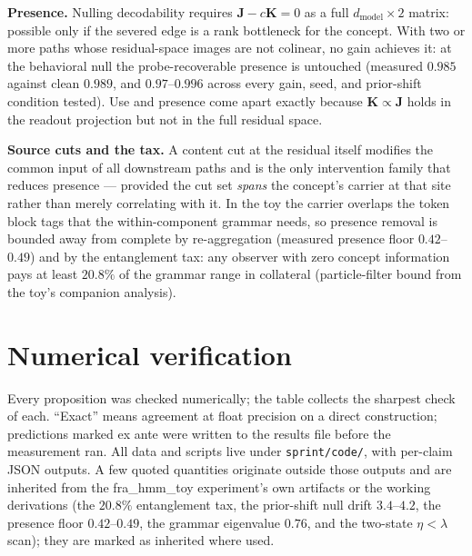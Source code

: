 \documentclass{article}
\newcommand{\Jb}{\boldsymbol{J}}
\newcommand{\Kb}{\boldsymbol{K}}
\theoremstyle{definition}
\begin{document}
\textbf{Presence.} Nulling decodability requires $\Jb - c\Kb = 0$ as a full
$d_{\mathrm{model}} \times 2$ matrix: possible only if the severed edge is a
rank bottleneck for the concept. With two or more paths whose residual-space
images are not colinear, no gain achieves it: at the behavioral null the
probe-recoverable presence is untouched (measured $0.985$ against clean
$0.989$, and $0.97$--$0.996$ across every gain, seed, and prior-shift
condition tested). Use and presence come apart exactly because
$\Kb \propto \Jb$ holds in the readout projection but not in the full
residual space.

\textbf{Source cuts and the tax.} A content cut at the residual itself
modifies the common input of all downstream paths and is the only
intervention family that reduces presence --- provided the cut set
\emph{spans} the concept's carrier at that site rather than merely
correlating with it. In the toy the carrier overlaps the token block tags
that the within-component grammar needs, so presence removal is bounded away
from complete by re-aggregation (measured presence floor $0.42$--$0.49$) and
by the entanglement tax: any observer with zero concept information pays at
least $20.8\%$ of the grammar range in collateral (particle-filter bound
from the toy's companion analysis).

\section{Numerical verification}

Every proposition was checked numerically; the table collects the sharpest
check of each. ``Exact'' means agreement at float precision on a direct
construction; predictions marked ex ante were written to the results file
before the measurement ran. All data and scripts live under
\texttt{sprint/code/}, with per-claim JSON outputs. A few quoted quantities
originate outside those outputs and are inherited from the fra\_hmm\_toy
experiment's own artifacts or the working derivations (the $20.8\%$
entanglement tax, the prior-shift null drift $3.4$--$4.2$, the presence
floor $0.42$--$0.49$, the grammar eigenvalue $0.76$, and the two-state
$\eta < \lambda$ scan); they are marked as inherited where used.
\end{document}
